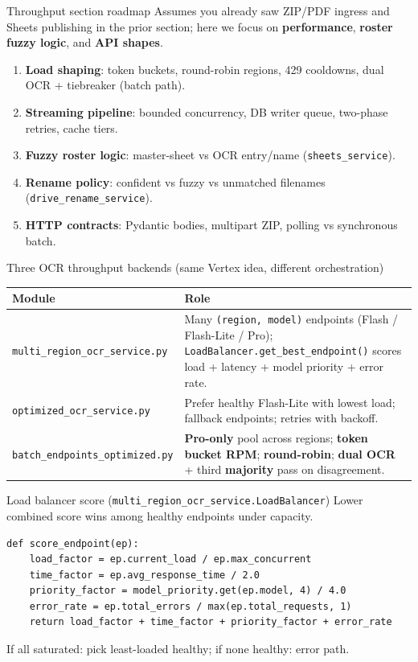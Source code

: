 \documentclass[aspectratio=169]{beamer}
\begin{document}
\begin{frame}{Throughput section roadmap}
  \small
  Assumes you already saw ZIP/PDF ingress and Sheets publishing in the prior section; here we focus on \textbf{performance}, \textbf{roster fuzzy logic}, and \textbf{API shapes}.\\
  \begin{enumerate}
    \item \textbf{Load shaping}: token buckets, round-robin regions, 429 cooldowns, dual OCR + tiebreaker (batch path).
    \item \textbf{Streaming pipeline}: bounded concurrency, DB writer queue, two-phase retries, cache tiers.
    \item \textbf{Fuzzy roster logic}: master-sheet vs OCR entry/name (\texttt{sheets\_service}).
    \item \textbf{Rename policy}: confident vs fuzzy vs unmatched filenames (\texttt{drive\_rename\_service}).
    \item \textbf{HTTP contracts}: Pydantic bodies, multipart ZIP, polling vs synchronous batch.
  \end{enumerate}
\end{frame}

\begin{frame}{Three OCR throughput backends (same Vertex idea, different orchestration)}
  \tiny
  \begin{tabular}{@{}p{3.2cm}p{11.4cm}@{}}
    \toprule
    Module & Role \\
    \midrule
    \texttt{multi\_region\_ocr\_service.py} & Many \texttt{(region, model)} endpoints (Flash / Flash-Lite / Pro); \texttt{LoadBalancer.get\_best\_endpoint()} scores load + latency + model priority + error rate. \\
    \texttt{optimized\_ocr\_service.py} & Prefer healthy Flash-Lite with lowest load; fallback endpoints; retries with backoff. \\
    \texttt{batch\_endpoints\_optimized.py} & \textbf{Pro-only} pool across regions; \textbf{token bucket RPM}; \textbf{round-robin}; \textbf{dual OCR} + third \textbf{majority} pass on disagreement. \\
    \bottomrule
  \end{tabular}
\end{frame}

\begin{frame}[fragile]{Load balancer score (\texttt{multi\_region\_ocr\_service.LoadBalancer})}
  \tiny
  Lower combined score wins among healthy endpoints under capacity.
\begin{lstlisting}[style=py]
def score_endpoint(ep):
    load_factor = ep.current_load / ep.max_concurrent
    time_factor = ep.avg_response_time / 2.0
    priority_factor = model_priority.get(ep.model, 4) / 4.0
    error_rate = ep.total_errors / max(ep.total_requests, 1)
    return load_factor + time_factor + priority_factor + error_rate
\end{lstlisting}
\vfill
\tiny If all saturated: pick least-loaded healthy; if none healthy: error path.
\end{frame}
\end{document}
